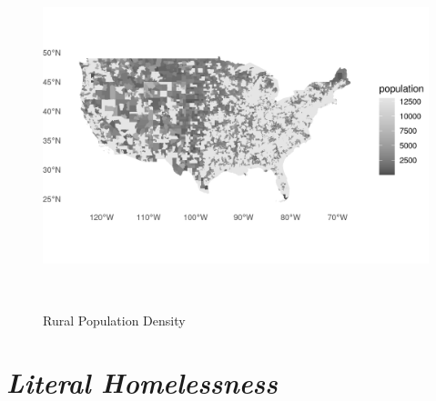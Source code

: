 \begin{figure}[htbp]
    \centering
     \includegraphics[width=1\textwidth, height=10cm]{plots/pop_map.png}
     \caption{Rural Population Density}
     \label{fig:pop_map}
 \end{figure}


\section{\textit{Literal Homelessness}}

